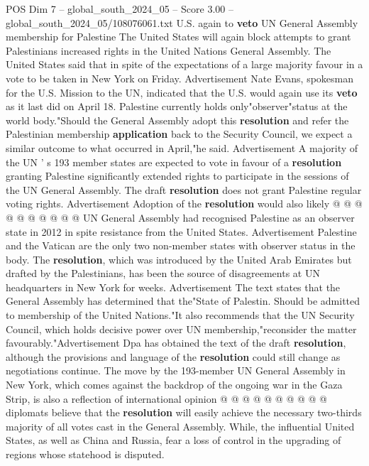 \begin{textsample}{POS Dim 7 – global\_south\_2024\_05 – Score 3.00 – global\_south\_2024\_05/108076061.txt}  \label{ex:f7_pos_066}
U.S. again to \textbf{veto} UN General Assembly membership for Palestine The United States will again block attempts to grant Palestinians increased rights in the United Nations General Assembly.
The United States said that in spite of the expectations of a large majority favour in a vote to be taken in New York on Friday.
Advertisement Nate Evans, spokesman for the U.S.
Mission to the UN, indicated that the U.S. would again use its \textbf{veto} as it last did on April 18.
Palestine currently holds only"observer"status at the world body."Should the General Assembly adopt this \textbf{resolution} and refer the Palestinian membership \textbf{application} back to the Security Council, we expect a similar outcome to what occurred in April,"he said.
Advertisement A majority of the UN ' s 193 member states are expected to vote in favour of a \textbf{resolution} granting Palestine significantly extended rights to participate in the sessions of the UN General Assembly.
The draft \textbf{resolution} does not grant Palestine regular voting rights.
Advertisement Adoption of the \textbf{resolution} would also likely @ @ @ @ @ @ @ @ @ @ UN General Assembly had recognised Palestine as an observer state in 2012 in spite resistance from the United States.
Advertisement Palestine and the Vatican are the only two non-member states with observer status in the body.
The \textbf{resolution}, which was introduced by the United Arab Emirates but drafted by the Palestinians, has been the source of disagreements at UN headquarters in New York for weeks.
Advertisement The text states that the General Assembly has determined that the"State of Palestin.
Should be admitted to membership of the United Nations."It also recommends that the UN Security Council, which holds decisive power over UN membership,"reconsider the matter favourably."Advertisement Dpa has obtained the text of the draft \textbf{resolution}, although the provisions and language of the \textbf{resolution} could still change as negotiations continue.
The move by the 193-member UN General Assembly in New York, which comes against the backdrop of the ongoing war in the Gaza Strip, is also a reflection of international opinion @ @ @ @ @ @ @ @ @ @ diplomats believe that the \textbf{resolution} will easily achieve the necessary two-thirds majority of all votes cast in the General Assembly.
While, the influential United States, as well as China and Russia, fear a loss of control in the upgrading of regions whose statehood is disputed.

\end{textsample}

